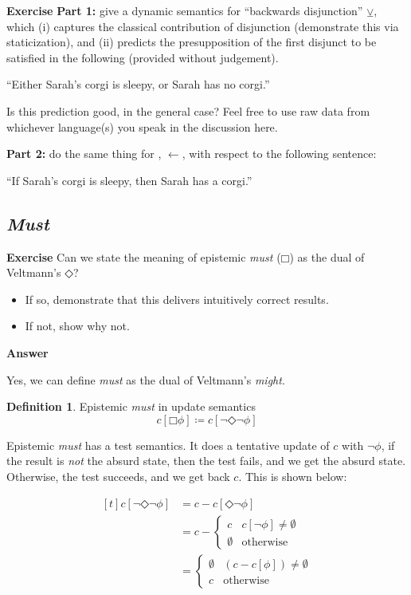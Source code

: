 \documentclass[nols,twoside,nofonts,nobib,nohyper]{tufte-handout}
\theoremstyle{definition}
\newtheorem{definition}{Definition}[section]
\begin{document}
  \begin{tcolorbox}
    \textbf{Exercise}
    \tcblower
    \textbf{Part 1:} give a dynamic semantics for \enquote{backwards disjunction} $⊻$, which (i) captures the classical contribution of disjunction (demonstrate this via staticization), and (ii) predicts the presupposition of the first disjunct to be satisfied in the following (provided without judgement).

    \enquote{Either Sarah's corgi is sleepy, or Sarah has no corgi.}

    Is this prediction good, in the general case? Feel free to use raw data from whichever language(s) you speak in the discussion here.

    \textbf{Part 2:} do the same thing for , $←$, with respect to the following sentence:

    \enquote{If Sarah's corgi is sleepy, then Sarah has a corgi.}
  \end{tcolorbox}

  \subsection{\textit{Must}}

\begin{tcolorbox}
  \textbf{Exercise}
  \tcblower
  Can we state the meaning of epistemic \textit{must} ($□$) as the dual of Veltmann's $◇$?
  \begin{itemize}
    \item If so, demonstrate that this delivers intuitively correct results.
    \item If not, show why not.
  \end{itemize}

\end{tcolorbox}

 \textbf{Answer}

  Yes, we can define \textit{must} as the dual of Veltmann's \textit{might}.

  \begin{definition}{Epistemic \textit{must} in update semantics}
        $$c[□ ϕ] ≔ c[¬ ◇ ¬ ϕ]$$
  \end{definition}

  Epistemic \textit{must} has a test semantics. It does a tentative update of $c$ with $¬ ϕ$, if the result is \textit{not} the absurd state, then the test fails, and we get the absurd state. Otherwise, the test succeeds, and we get back $c$. This is shown below:

  $$\begin{aligned}[t]
    c[¬ ◇ ¬ ϕ] &= c - c[◇ ¬ ϕ]\\
      &= c - \begin{cases}
    c&c[¬ ϕ] ≠ ∅\\
    ∅&\text{otherwise}
    \end{cases}\\
&= \begin{cases}
    \emptyset & (c - c[ϕ]) ≠ ∅\\
    c&\text{otherwise}
  \end{cases}
\end{aligned}
  $$

\printbibliography
\end{document}
